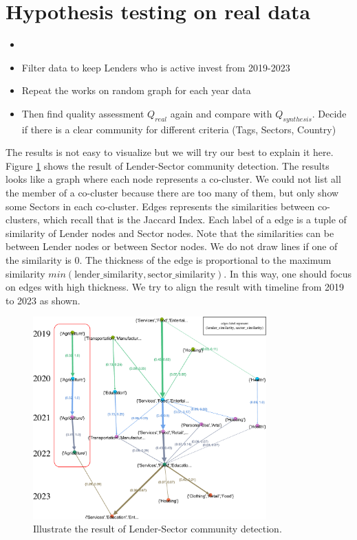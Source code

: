 \section{Hypothesis testing on real data}

\begin{itemize}
	\item
	\item Filter data to keep Lenders who is active invest from 2019-2023
	\item Repeat the works on random graph for each year data
	\item Then find quality assessment $Q_{real}$ again and compare with $Q_{synthesis}$.
	      Decide if there is a clear community for different criteria (Tags, Sectors, Country)
\end{itemize}

% 

The results is not easy to visualize but we will try our best to explain it here.
Figure \ref{fig:appendix-LSector} shows the result of Lender-Sector community detection.
The results looks like a graph where each node represents a co-cluster.
We could not list all the member of a co-cluster because there are too many of them,
but only show some Sectors in each co-cluster.
Edges represents the similarities between co-clusters, which recall that is the Jaccard Index.
Each label of a edge is a tuple of similarity of Lender nodes and Sector nodes.
Note that the similarities can be between Lender nodes or between Sector nodes.
We do not draw lines if one of the similarity is $0$.
The thickness of the edge is proportional to the maximum similarity $min(\text{lender\_similarity}, \text{sector\_similarity})$.
In this way, one should focus on edges with high thickness.
We try to align the result with timeline from 2019 to 2023 as shown.

\begin{figure}[H]
	\centering
	\includegraphics[width=0.8\textwidth]{images/LSector.pdf}
	\caption{Illustrate the result of Lender-Sector community detection.}
	\label{fig:appendix-LSector}
\end{figure}


